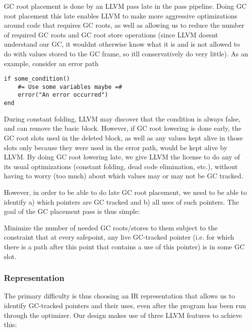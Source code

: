 GC root placement is done by an LLVM pass late in the pass pipeline. Doing GC root placement this late enables LLVM to make more aggressive optimizations around code that requires GC roots, as well as allowing us to reduce the number of required GC roots and GC root store operations (since LLVM doesn{\textquotesingle}t understand our GC, it wouldn{\textquotesingle}t otherwise know what it is and is not allowed to do with values stored to the GC frame, so it{\textquotesingle}ll conservatively do very little). As an example, consider an error path




\begin{verbatim}
if some_condition()
    #= Use some variables maybe =#
    error("An error occurred")
end
\end{verbatim}



During constant folding, LLVM may discover that the condition is always false, and can remove the basic block. However, if GC root lowering is done early, the GC root slots used in the deleted block, as well as any values kept alive in those slots only because they were used in the error path, would be kept alive by LLVM. By doing GC root lowering late, we give LLVM the license to do any of its usual optimizations (constant folding, dead code elimination, etc.), without having to worry (too much) about which values may or may not be GC tracked.



However, in order to be able to do late GC root placement, we need to be able to identify a) which pointers are GC tracked and b) all uses of such pointers. The goal of the GC placement pass is thus simple:



Minimize the number of needed GC roots/stores to them subject to the constraint that at every safepoint, any live GC-tracked pointer (i.e. for which there is a path after this point that contains a use of this pointer) is in some GC slot.



\hypertarget{8769102480019606347}{}


\subsubsection{Representation}



The primary difficulty is thus choosing an IR representation that allows us to identify GC-tracked pointers and their uses, even after the program has been run through the optimizer. Our design makes use of three LLVM features to achieve this:



